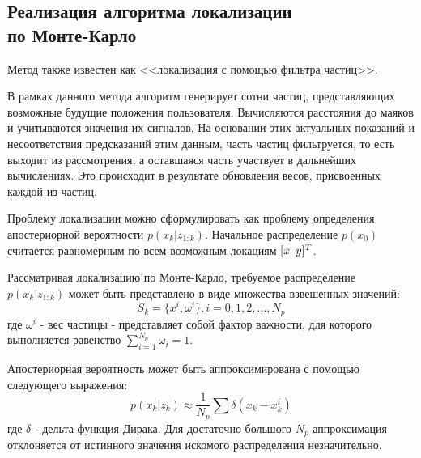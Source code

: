 \subsection{Реализация алгоритма локализации \\по Монте-Карло}

Метод также известен как <<локализация с помощью фильтра частиц>>.

В рамках данного метода алгоритм генерирует сотни частиц, представляющих возможные будущие положения пользователя. Вычисляются расстояния до маяков и учитываются значения их сигналов. На основании этих актуальных показаний и несоответствия предсказаний этим данным, часть частиц фильтруется, то есть выходит из рассмотрения, а оставшаяся часть участвует в дальнейших вычислениях. Это происходит в результате обновления весов, присвоенных каждой из частиц.

Проблему локализации можно сформулировать как проблему определения апостериорной вероятности  $p(x_k | z_{1:k})$. Начальное распределение $p(x_0)$ считается равномерным по всем возможным локациям $[x \enskip y]^T$.

Рассматривая локализацию по Монте-Карло, требуемое распределение \\$p(x_k | z_{1:k})$ может быть представлено в виде множества взвешенных значений:
\[
    S_k = \{ x^i, \omega^i \}, i = 0,1,2,...,N_p
\]
где $\omega^i$ - вес частицы - представляет собой фактор важности, для которого выполняется равенство $\sum_{i=1}^{N_p} \omega_i = 1$. 

Апостериорная вероятность может быть аппроксимирована с помощью следующего выражения:
\[
    p(x_k | z_k) \approx \frac{1}{N_p} \sum \delta (x_k - x_k^i)
\]
где $\delta$ - дельта-функция Дирака. Для достаточно большого $N_p$ аппроксимация отклоняется от истинного значения искомого распределения незначительно.

